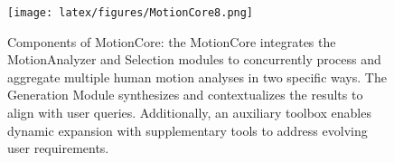 \vspace{-0.10in}
\begin{figure}[t]
\centering
\texttt{[image: latex/figures/MotionCore8.png]} %
\vspace{-0.20in}
\caption{Components of MotionCore: the MotionCore integrates the MotionAnalyzer and Selection modules to concurrently process and aggregate multiple human motion analyses in two specific ways. The Generation Module synthesizes and contextualizes the results to align with user queries. Additionally, an auxiliary toolbox enables dynamic expansion with supplementary tools to address evolving user requirements.}
\label{MotionCore}
\vspace{-0.15in}
\end{figure}